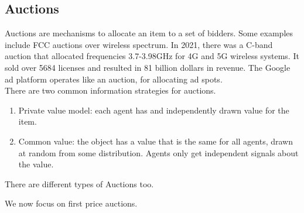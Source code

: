 \subsection*{Auctions}
Auctions are mechanisms to allocate an item to a set of bidders. Some examples include FCC auctions over wireless spectrum. In 2021, there was a C-band auction that allocated frequencies 3.7-3.98GHz for 4G and 5G wireless systems. It sold over 5684 licenses and resulted in 81 billion dollars in revenue. The Google ad platform operates like an auction, for allocating ad spots.
\\
There are two common information strategies for auctions.
\begin{enumerate}
    \item Private value model: each agent has and independently drawn value for the item.
    \item Common value: the object has a value that is the same for all agents, drawn at random from some distribution. Agents only get independent signals about the value.
\end{enumerate}

There are different types of Auctions too.

We now focus on first price auctions.

